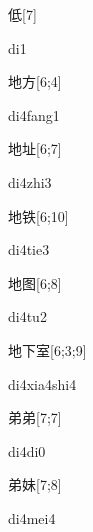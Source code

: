 \begin{verbete}[di1]{低}[7]
\begin{pronuncia}{di1}
\end{pronuncia}
\end{verbete}

\begin{verbete}[di4fang1]{地方}[6;4]
\begin{pronuncia}{di4fang1}
\end{pronuncia}
\end{verbete}

\begin{verbete}[di4zhi3]{地址}[6;7]
\begin{pronuncia}{di4zhi3}
\end{pronuncia}
\end{verbete}

\begin{verbete}[di4tie3]{地铁}[6;10]
\begin{pronuncia}{di4tie3}
\end{pronuncia}
\end{verbete}

\begin{verbete}[di4tu2]{地图}[6;8]
\begin{pronuncia}{di4tu2}
\end{pronuncia}
\end{verbete}

\begin{verbete}{地下室}[6;3;9]
\begin{pronuncia}{di4xia4shi4}
\end{pronuncia}
\end{verbete}

\begin{verbete}[di4di0]{弟弟}[7;7]
\begin{pronuncia}{di4di0}
\end{pronuncia}
\end{verbete}

\begin{verbete}[di4mei4]{弟妹}[7;8]
\begin{pronuncia}{di4mei4}
\end{pronuncia}
\end{verbete}

